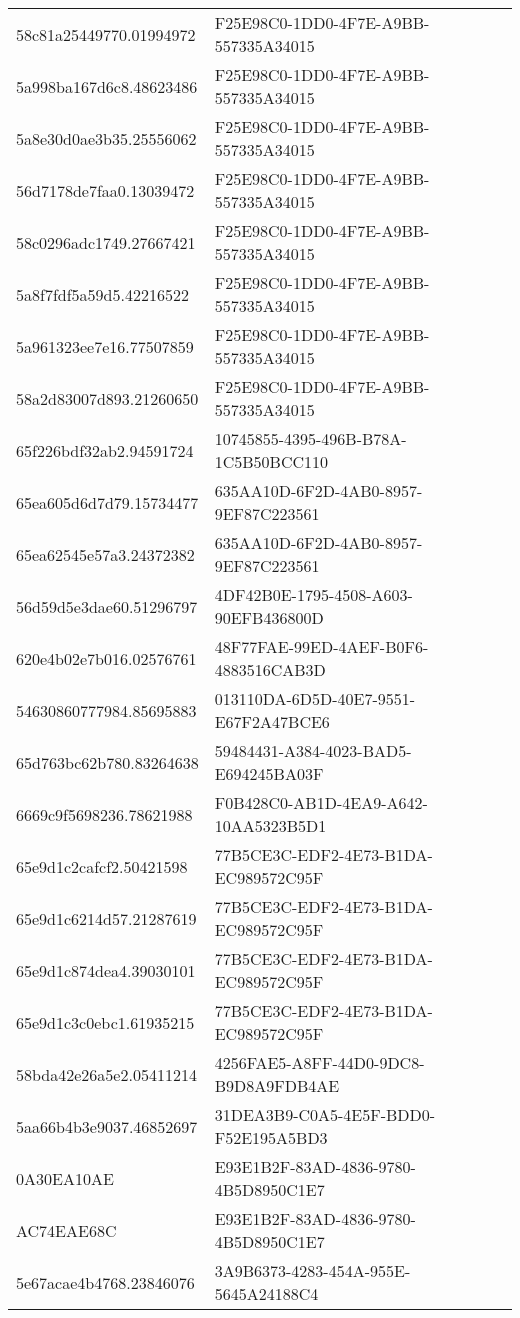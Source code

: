 \begin{tabular}{ll}
58c81a25449770.01994972 & F25E98C0-1DD0-4F7E-A9BB-557335A34015 \\
5a998ba167d6c8.48623486 & F25E98C0-1DD0-4F7E-A9BB-557335A34015 \\
5a8e30d0ae3b35.25556062 & F25E98C0-1DD0-4F7E-A9BB-557335A34015 \\
56d7178de7faa0.13039472 & F25E98C0-1DD0-4F7E-A9BB-557335A34015 \\
58c0296adc1749.27667421 & F25E98C0-1DD0-4F7E-A9BB-557335A34015 \\
5a8f7fdf5a59d5.42216522 & F25E98C0-1DD0-4F7E-A9BB-557335A34015 \\
5a961323ee7e16.77507859 & F25E98C0-1DD0-4F7E-A9BB-557335A34015 \\
58a2d83007d893.21260650 & F25E98C0-1DD0-4F7E-A9BB-557335A34015 \\
65f226bdf32ab2.94591724 & 10745855-4395-496B-B78A-1C5B50BCC110 \\
65ea605d6d7d79.15734477 & 635AA10D-6F2D-4AB0-8957-9EF87C223561 \\
65ea62545e57a3.24372382 & 635AA10D-6F2D-4AB0-8957-9EF87C223561 \\
56d59d5e3dae60.51296797 & 4DF42B0E-1795-4508-A603-90EFB436800D \\
620e4b02e7b016.02576761 & 48F77FAE-99ED-4AEF-B0F6-4883516CAB3D \\
54630860777984.85695883 & 013110DA-6D5D-40E7-9551-E67F2A47BCE6 \\
65d763bc62b780.83264638 & 59484431-A384-4023-BAD5-E694245BA03F \\
6669c9f5698236.78621988 & F0B428C0-AB1D-4EA9-A642-10AA5323B5D1 \\
65e9d1c2cafcf2.50421598 & 77B5CE3C-EDF2-4E73-B1DA-EC989572C95F \\
65e9d1c6214d57.21287619 & 77B5CE3C-EDF2-4E73-B1DA-EC989572C95F \\
65e9d1c874dea4.39030101 & 77B5CE3C-EDF2-4E73-B1DA-EC989572C95F \\
65e9d1c3c0ebc1.61935215 & 77B5CE3C-EDF2-4E73-B1DA-EC989572C95F \\
58bda42e26a5e2.05411214 & 4256FAE5-A8FF-44D0-9DC8-B9D8A9FDB4AE \\
5aa66b4b3e9037.46852697 & 31DEA3B9-C0A5-4E5F-BDD0-F52E195A5BD3 \\
0A30EA10AE & E93E1B2F-83AD-4836-9780-4B5D8950C1E7 \\
AC74EAE68C & E93E1B2F-83AD-4836-9780-4B5D8950C1E7 \\
5e67acae4b4768.23846076 & 3A9B6373-4283-454A-955E-5645A24188C4 \\

\end{tabular}
